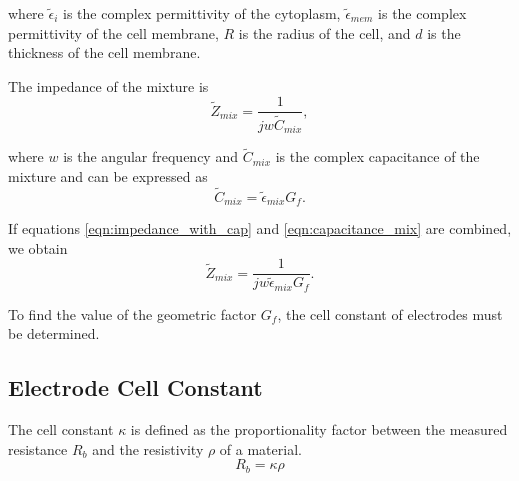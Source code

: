   \noindent where $\tilde{\epsilon}_i$ is the complex permittivity of the cytoplasm, $\tilde{\epsilon}_{mem}$ is the complex permittivity of the cell membrane, $R$ is the radius of the cell, and $d$ is the thickness of the cell membrane.
  
  
  
  
  \par The impedance of the mixture is
  \begin{equation}
    \tilde{Z}_{mix} = \frac{1}{jw\tilde{C}_{mix}},
    \label{eqn:impedance_with_cap}
  \end{equation}
  
  \noindent where $w$ is the angular frequency and $\tilde{C}_{mix}$ is the complex capacitance of the mixture and can be expressed as
  \begin{equation}
      \tilde{C}_{mix} = \tilde{\epsilon}_{mix} G_f.
      \label{eqn:capacitance_mix}
  \end{equation}
  
  \noindent If equations \ref{eqn:impedance_with_cap} and \ref{eqn:capacitance_mix} are combined, we obtain
  \begin{equation}
    \tilde{Z}_{mix} = \frac{1}{jw\tilde{\epsilon}_{mix}G_f}.
    \label{eqn:impedance_with_Gf}
  \end{equation}
  
  \par To find the value of the geometric factor $G_f$, the cell constant of electrodes must be determined.
  
  
  \subsection{Electrode Cell Constant}
  \label{sec:electrode_cell_constant}
  \par The cell constant $\kappa$ is defined as the proportionality factor between the measured resistance $R_b$ and the resistivity $\rho$ of a material.
  \begin{equation}
      R_b = \kappa \rho
      \label{eqn:cell_constant_proportionality}
  \end{equation}
  
